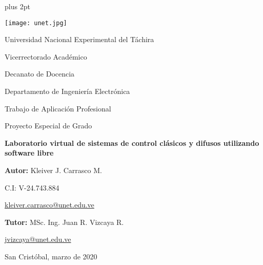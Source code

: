 \begin{titlepage}
	\parskip=7.25pt plus 2pt
	\begin{center}
		\texttt{[image: unet.jpg]}
		
		Universidad Nacional Experimental del Táchira 
		
		Vicerrectorado Académico
		
		Decanato de Docencia
		
		Departamento de Ingeniería Electrónica
		
		Trabajo de Aplicación Profesional
		
		Proyecto Especial de Grado
	\end{center}
	
	\centering
		\vspace{2.5cm}
		\vfill
		{\Large \textbf{Laboratorio virtual de sistemas de control clásicos y difusos utilizando software libre}\par}
	
	\vfill
	\begin{flushright}
		\begin{spacing}{1.5}
			\textbf{Autor:} Kleiver J. Carrasco M.
			
			C.I: V-24.743.884
			
			\href{kleiver.carrasco@unet.edu.ve}{kleiver.carrasco@unet.edu.ve}
			
			\textbf{Tutor:} MSc. Ing. Juan R. Vizcaya R.
			
			\href{jvizcaya@unet.edu.ve}{jvizcaya@unet.edu.ve}
		\end{spacing}	
	\end{flushright}
	
	\vfill
		San Cristóbal, marzo de 2020
	\leavevmode
	\end{titlepage}